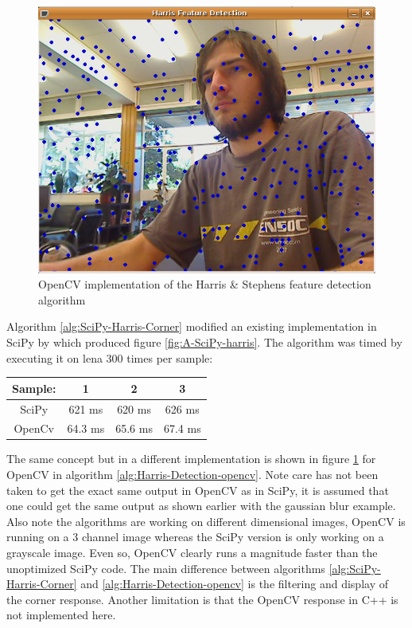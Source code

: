 \documentclass[english]{IEEEtran}
\providecommand{\tabularnewline}{\\}
\theoremstyle{plain}
\begin{document}
\begin{figure}[h]
\begin{centering}
\includegraphics[width=0.9\columnwidth]{report_data/opencv_python_harris}
\par\end{centering}

\caption{\label{fig:OpenCV-harris}OpenCV implementation of the Harris \& Stephens
feature detection algorithm}

\end{figure}


Algorithm \ref{alg:SciPy-Harris-Corner} modified an existing implementation
in SciPy by \cite{Sol09} which produced figure \ref{fig:A-SciPy-harris}.
The algorithm was timed by executing it on lena 300 times per sample:

\begin{tabular}{|c|c|c|c|}
\hline 
Sample: & 1 & 2 & 3\tabularnewline
\hline
\hline 
SciPy & 621 ms & 620 ms & 626 ms\tabularnewline
\hline 
OpenCv & 64.3 ms & 65.6 ms & 67.4 ms\tabularnewline
\hline
\end{tabular}

The same concept but in a different implementation is shown in figure
\ref{fig:OpenCV-harris} for OpenCV in algorithm \ref{alg:Harris-Detection-opencv}.
Note care has not been taken to get the exact same output in OpenCV
as in SciPy, it is assumed that one could get the same output as shown
earlier with the gaussian blur example. Also note the algorithms are
working on different dimensional images, OpenCV is running on a 3
channel image whereas the SciPy version is only working on a grayscale
image. Even so, OpenCV clearly runs a magnitude faster than the unoptimized
SciPy code. The main difference between algorithms \ref{alg:SciPy-Harris-Corner}
and \ref{alg:Harris-Detection-opencv} is the filtering and display
of the corner response. Another limitation is that the OpenCV response
in C++ is not implemented here.
\end{document}
